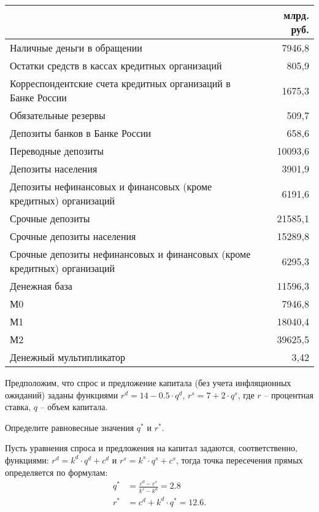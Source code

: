 \documentclass[12pt, table]{exam}
\begin{document}
\begin{questions}
\begin{solution}[12em]
\small
\begin{tabularx}{\linewidth}[b]{@{}>{\raggedright\arraybackslash}Xr@{}}				& млрд. руб.\\
	\toprule
	Наличные деньги в обращении & 7946,8 \\
	Остатки средств в кассах кредитных организаций & 805,9 \\
	Корреспондентские счета кредитных организаций в Банке России & 1675,3 \\
	Обязательные резервы & 509,7 \\
	Депозиты банков в Банке России & 658,6 \\
	Переводные депозиты & 10093,6 \\
	Депозиты населения & 3901,9 \\
	Депозиты нефинансовых и финансовых (кроме кредитных) организаций & 6191,6 \\
	Срочные депозиты & 21585,1 \\
	Срочные депозиты населения & 15289,8 \\
	Срочные депозиты нефинансовых и финансовых (кроме кредитных) организаций & 6295,3 \\
	\midrule
	Денежная база & 11596,3 \\
	М0    & 7946,8 \\
	М1    & 18040,4 \\
	М2    & 39625,5 \\
	Денежный мультипликатор & 3,42 \\
	\bottomrule
\end{tabularx}%
\normalsize
\end{solution}

\pagebreak	
\question[10] Предположим, что спрос и предложение капитала (без учета инфляционных ожиданий) заданы функциями 	
$r^d=14-0.5 \cdot q^d$, $r^s=7 + 2 \cdot q^s$, где 	
$r$ – процентная ставка, 	
$q$ – объем капитала.	
\noaddpoints
\begin{subparts}
	\subpart[2] Определите равновесные значения $q^*$ и $r^*$.

	\begin{solution}[12em]
		
		\raggedright		
		Пусть уравнения спроса и предложения на капитал задаются, соответственно, функциями: $r^d=k^d\cdot q^d +c^d$ и $r^s=k^s\cdot q^s +c^s$, тогда точка пересечения прямых определяется по формулам:
		\begin{align*}
		q^*&=\frac{c^d-c^s}{k^s-k^d}=2.8\\
		r^*&=c^d + k^d \cdot q^* =12.6.
		\end{align*}
	\end{solution}
	

\end{subparts}
\end{questions}
\end{document}
